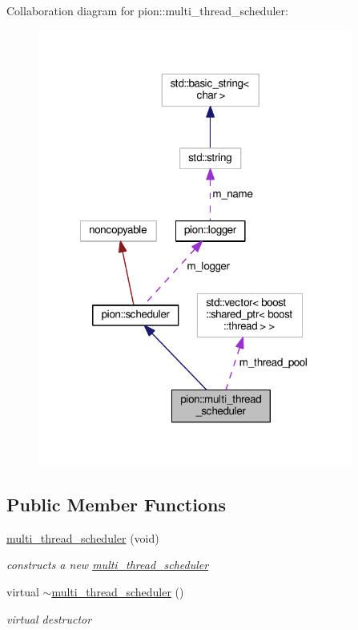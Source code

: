 Collaboration diagram for pion\-:\-:multi\-\_\-thread\-\_\-scheduler\-:
\nopagebreak
\begin{figure}[H]
\begin{center}
\leavevmode
\includegraphics[width=293pt]{classpion_1_1multi__thread__scheduler__coll__graph}
\end{center}
\end{figure}
\subsection*{Public Member Functions}
\begin{DoxyCompactItemize}
\item 
\hyperlink{classpion_1_1multi__thread__scheduler_a7e60ea90622a43533abd1c7c6106d66c}{multi\-\_\-thread\-\_\-scheduler} (void)
\begin{DoxyCompactList}\small\item\em constructs a new \hyperlink{classpion_1_1multi__thread__scheduler}{multi\-\_\-thread\-\_\-scheduler} \end{DoxyCompactList}\item 
virtual \hyperlink{classpion_1_1multi__thread__scheduler_a708525e3a1d80e350ca7030c8859221e}{$\sim$multi\-\_\-thread\-\_\-scheduler} ()
\begin{DoxyCompactList}\small\item\em virtual destructor \end{DoxyCompactList}\end{DoxyCompactItemize}
